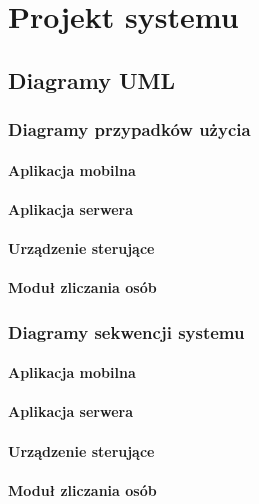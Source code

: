% 
\newpage\section{Projekt systemu \textsl{\NazwaSys}}\label{sec:projekt}
\subsection{Diagramy UML}

	\subsubsection{Diagramy przypadków użycia}
	
		\paragraph{Aplikacja mobilna}
		\paragraph{Aplikacja serwera}
		\paragraph{Urządzenie sterujące}
		\paragraph{Moduł zliczania osób}
		
	\subsubsection{Diagramy sekwencji systemu}
	
		\paragraph{Aplikacja mobilna}
		\paragraph{Aplikacja serwera}
		\paragraph{Urządzenie sterujące}
		\paragraph{Moduł zliczania osób}
		
